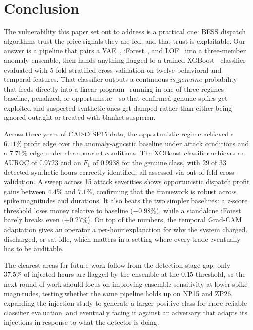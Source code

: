 \documentclass[journal]{IEEEtran}
\begin{document}
\section{Conclusion}

The vulnerability this paper set out to address is a practical one: BESS dispatch algorithms trust the price signals they are fed, and that trust is exploitable. Our answer is a pipeline that pairs a VAE~\cite{VAE}, iForest~\cite{IForest}, and LOF~\cite{LOF} into a three-member anomaly ensemble, then hands anything flagged to a trained XGBoost~\cite{XGBoost} classifier evaluated with 5-fold stratified cross-validation on twelve behavioral and temporal features. That classifier outputs a continuous $is\_genuine$ probability that feeds directly into a linear program~\cite{HiGHS, Pyomo} running in one of three regimes---baseline, penalized, or opportunistic---so that confirmed genuine spikes get exploited and suspected synthetic ones get damped rather than either being ignored outright or treated with blanket suspicion.

Across three years of CAISO SP15 data, the opportunistic regime achieved a $6.11\%$ profit edge over the anomaly-agnostic baseline under attack conditions and a $7.70\%$ edge under clean-market conditions. The XGBoost classifier achieves an AUROC of $0.9723$ and an $F_1$ of $0.9938$ for the genuine class, with $29$ of $33$ detected synthetic hours correctly identified, all assessed via out-of-fold cross-validation. A sweep across 15 attack severities shows opportunistic dispatch profit gains between $4.4\%$ and $7.1\%$, confirming that the framework is robust across spike magnitudes and durations. It also beats the two simpler baselines: a z-score threshold loses money relative to baseline ($-0.98\%$), while a standalone iForest barely breaks even ($+0.27\%$). On top of the numbers, the temporal Grad-CAM~\cite{GradCAM} adaptation gives an operator a per-hour explanation for why the system charged, discharged, or sat idle, which matters in a setting where every trade eventually has to be auditable.

The clearest areas for future work follow from the detection-stage gap: only $37.5\%$ of injected hours are flagged by the ensemble at the $0.15$ threshold, so the next round of work should focus on improving ensemble sensitivity at lower spike magnitudes, testing whether the same pipeline holds up on NP15 and ZP26, expanding the injection study to generate a larger positive class for more reliable classifier evaluation, and eventually facing it against an adversary that adapts its injections in response to what the detector is doing.



\end{document}
